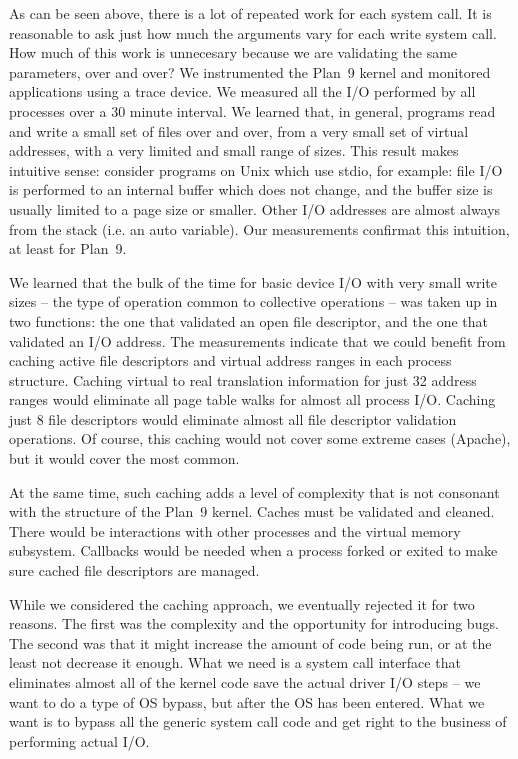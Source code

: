 \documentclass[letterpaper,twocolumn,10pt]{article}
\begin{document}
As can be seen above, there is a lot of repeated work for each system call. It is reasonable to ask just how much the arguments vary for each write system call. How much of this work is unnecesary because we are validating the same parameters, over and over? 
We instrumented the Plan~9 kernel and monitored 
applications using  a trace device\cite{iwp9:tracedevice}. We measured all the I/O performed by all processes over 
a 30 minute interval. We learned that, in general, programs read and write a small 
set of files over and over, from a very small set of virtual addresses, with a very limited and small range of sizes. This result makes intuitive sense: consider programs on Unix which use stdio, for example: file I/O is performed 
to an internal buffer which does not change, and the buffer size is usually limited to a page size or smaller. Other I/O addresses are almost always from the stack (i.e. an auto variable). Our measurements confirmat this intuition, at least for Plan~9. 

We learned that the bulk of the time for basic device I/O with very small write sizes -- the type of operation common to collective operations -- was taken up in two functions: the one that validated an open file descriptor, and the one that validated an I/O address. 
The measurements indicate that we could benefit from caching active file descriptors and virtual address ranges in each process structure. Caching virtual to real translation information for just 32 address ranges would eliminate all page table walks for almost all process I/O. Caching just 8 file descriptors would eliminate almost all file descriptor validation operations. Of course, this caching would not cover some extreme cases (Apache), but it would cover the most common. 


At the same time, such caching adds a level of complexity that is not consonant with the structure of the Plan~9 kernel. Caches must be validated and cleaned. There would be interactions with other processes and the virtual memory subsystem. Callbacks would be needed when a process forked or exited to make sure cached file descriptors are managed. 

While we considered the caching approach, we eventually rejected it for two reasons. The first was the complexity and the opportunity for introducing bugs. The second was that it might increase the amount of code being run, or at the least not decrease it enough. What we need is a system call interface that eliminates almost all of the kernel code save the actual driver I/O steps -- we want to do a type of OS bypass, but after the OS has been entered. What we want is to bypass all the generic system call code and get right to the business of performing actual I/O. 
\end{document}
